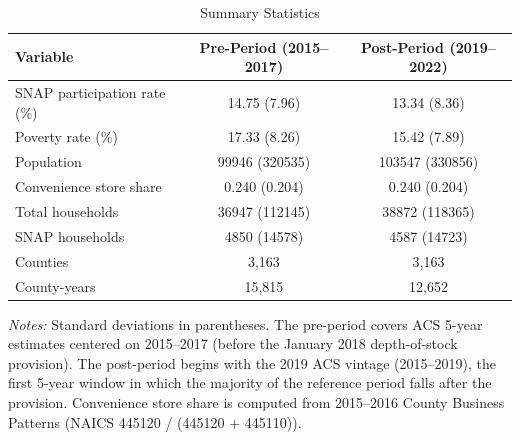\begin{table}[htbp]
\centering
\caption{Summary Statistics}
\label{tab:summary}
\begin{tabular}{lcc}
\toprule
Variable & Pre-Period (2015--2017) & Post-Period (2019--2022) \\
\midrule
SNAP participation rate (\%) & 14.75 (7.96) & 13.34 (8.36) \\
Poverty rate (\%) & 17.33 (8.26) & 15.42 (7.89) \\
Population & 99946 (320535) & 103547 (330856) \\
Convenience store share & 0.240 (0.204) & 0.240 (0.204) \\
Total households & 36947 (112145) & 38872 (118365) \\
SNAP households & 4850 (14578) & 4587 (14723) \\
\midrule
Counties & 3,163 & 3,163 \\
County-years & 15,815 & 12,652 \\
\bottomrule
\end{tabular}
\begin{tablenotes}[flushleft]
\small
\item \textit{Notes:} Standard deviations in parentheses. The pre-period covers ACS 5-year estimates centered on 2015--2017 (before the January 2018 depth-of-stock provision). The post-period begins with the 2019 ACS vintage (2015--2019), the first 5-year window in which the majority of the reference period falls after the provision. Convenience store share is computed from 2015--2016 County Business Patterns (NAICS 445120 / (445120 + 445110)).
\end{tablenotes}
\end{table}

